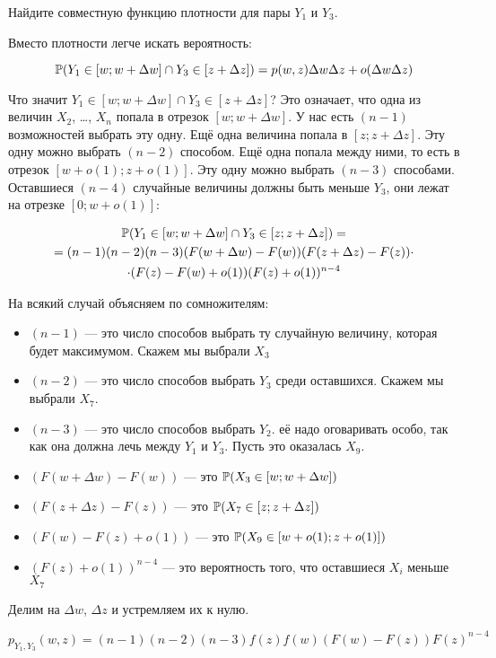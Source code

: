\begin{myex}
Найдите совместную функцию плотности для пары  $ Y_{1} $ и $ Y_{3} $.

Вместо плотности легче искать вероятность:

\begin{equation}
 \P(Y_{1}\in [w;w+\Delta w] \cap Y_{3} \in [z+\Delta z] )=p(w,z)\Delta w\Delta z+o(\Delta w \Delta z)
\end{equation}


Что значит $ Y_{1} \in [w;w+\Delta w] \cap Y_{3} \in [z+\Delta z]$? Это означает, что одна из величин $ X_{2} $, \ldots, $ X_{n} $ попала в отрезок $ [w;w+\Delta w] $. У нас есть $ (n-1) $ возможностей выбрать эту одну. Ещё одна величина попала в $ [z;z+\Delta z] $. Эту одну можно выбрать $ (n-2) $ способом. Ещё одна попала между ними, то есть в отрезок $ [w+o(1);z+o(1)] $. Эту одну можно выбрать $(n-3)$ способами. Оставшиеся $ (n-4) $ случайные величины должны быть меньше $ Y_{3} $, они лежат на отрезке $ [0;w+o(1)] $:

\begin{multline}
\P(Y_{1}\in [w;w+\Delta w] \cap Y_{3}\in [z;z+\Delta z] ) =\\
= (n-1)(n-2)(n-3) (F(w+\Delta w)-F(w)) (F(z+\Delta z)-F(z))\cdot \\
\cdot (F(z)-F(w)+o(1)) (F(z)+o(1))^{n-4}
\end{multline}

На всякий случай объясняем по сомножителям:
\begin{itemize}
\item $(n-1)  $ — это число способов выбрать ту случайную величину, которая будет максимумом. Скажем мы выбрали $ X_{3} $
\item $ (n-2) $ — это число способов выбрать $ Y_{3} $ среди оставшихся. Скажем мы выбрали $ X_{7} $.
\item $ (n-3) $ — это число способов выбрать $ Y_{2} $. её надо оговаривать особо, так как она должна лечь между $ Y_{1} $ и $ Y_{3} $. Пусть это оказалась $ X_{9} $.
\item $(F(w+\Delta w)-F(w))$ — это $ \P(X_{3}\in [w;w+\Delta w]) $
\item $(F(z+\Delta z)-F(z))$ — это $ \P(X_{7}\in [z;z+\Delta z] ) $
\item $(F(w)-F(z)+o(1))$ — это $ \P(X_{9}\in [w+o(1);z+o(1)] ) $
\item $ (F(z)+o(1))^{n-4} $ — это вероятность того, что оставшиеся $ X_{i} $ меньше $ X_{7} $
\end{itemize}

Делим на $ \Delta w $, $ \Delta z $ и устремляем их к нулю.

\begin{equation}
p_{Y_{1},Y_{3}}(w,z)=(n-1)(n-2)(n-3)f(z)f(w)(F(w)-F(z))F(z)^{n-4}
\end{equation}

\end{myex}










